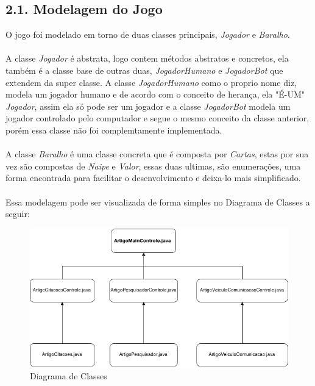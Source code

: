 \documentclass[12pt, a4paper]{article}
\begin{document}
  \subsection*{2.1. Modelagem do Jogo}
  O jogo foi modelado em torno de duas classes principais, \textit{Jogador} e \textit{Baralho}.
  \\\\
  A classe \textit{Jogador} é abstrata, logo contem métodos abstratos e concretos, ela também é a classe base de outras duas, \textit{JogadorHumano} e \textit{JogadorBot} que extendem da super classe. A classe \textit{JogadorHumano} como o proprio nome diz, modela um jogador humano e de acordo com o conceito de herança, ela "É-UM" \textit{Jogador}, assim ela só pode ser um jogador  e a classe \textit{JogadorBot} modela um jogador controlado pelo computador e segue o mesmo conceito da classe anterior, porém essa classe não foi complemtamente implementada.\\\\
  A classe \textit{Baralho} é uma classe concreta que é composta por \textit{Cartas}, estas por sua vez são compostas de \textit{Naipe} e \textit{Valor}, essas duas ultimas, são enumerações, uma forma encontrada para facilitar o desenvolvimento e deixa-lo mais simplificado.
  \\\\
  Essa modelagem pode ser visualizada de forma simples no Diagrama de Classes a seguir:

  \begin{figure}[!htb]
   \centering
   \includegraphics[scale=0.5]{Artigo}
   \caption{Diagrama de Classes}
   \label{Rotulo}
  \end{figure}
\end{document}
